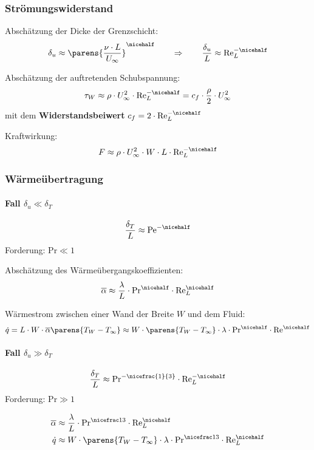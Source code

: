 		\subsubsection{Strömungswiderstand} %
			Abschätzung der Dicke der Grenzschicht:
			\[
				\delta_u \approx \parens{
					\frac{\nu \cdot L}{U_\infty}
				}^{\nicehalf}
				\qquad \Rightarrow \qquad
				\frac {\delta_u} L \approx \mathrm{Re}_L^{-\nicehalf}
			\]
			
			Abschätzung der auftretenden Schubspannung:
			\[
				\tau_W \approx \rho \cdot U_\infty^2 \cdot \mathrm{Re}_L^{-\nicehalf} = c_f \cdot \frac \rho 2 \cdot U_\infty^2
			\]
			mit dem \textbf{Widerstandsbeiwert}
			$
				c_f = 2 \cdot \mathrm{Re}_L^{-\nicehalf}
			$
			
			Kraftwirkung:
			\[
				F \approx \rho \cdot U_\infty^2 \cdot W \cdot L \cdot \mathrm{Re}_L^{- \nicehalf}
			\]
		\subsubsection{Wärmeübertragung} %
			\paragraph{Fall $\delta_u \ll \delta_T$} %
				\[
					\frac{\delta_T}{L} \approx \mathrm{Pe}^{- \nicehalf}
				\]
				Forderung: $\mathrm{Pr} \ll 1$
				
				Abschätzung des Wärmeübergangskoeffizienten:
				\[
					\overline\alpha \approx \frac{\lambda}{L} \cdot \mathrm{Pr}^{\nicehalf} \cdot \mathrm{Re}_L^{\nicehalf}
				\]
				
				Wärmestrom zwischen einer Wand der Breite $W$ und dem Fluid:
				\[
					\dot q = L \cdot W \cdot \overline\alpha \parens{T_W - T_\infty}
					\approx W \cdot \parens{T_W - T_\infty} \cdot \lambda \cdot \mathrm{Pr}^{\nicehalf} \cdot \mathrm{Re}^{\nicehalf}
				\]
			\paragraph{Fall $\delta_u \gg \delta_T$} %
				\[
					\frac{\delta_T}{L} \approx \mathrm{Pr}^{- \nicefrac{1}{3}} \cdot \mathrm{Re}_L^{-\nicehalf}
				\]
				Forderung: $\mathrm{Pr} \gg 1$
				
				\begin{align*}
					\overline\alpha &\approx \frac \lambda L \cdot \mathrm{Pr}^{\nicefrac 1 3} \cdot \mathrm{Re}_L^{\nicehalf} \\
					\dot q &\approx W \cdot \parens{T_W - T_\infty} \cdot \lambda \cdot \mathrm{Pr}^{\nicefrac 1 3} \cdot \mathrm{Re}_L^{\nicehalf}
				\end{align*}
